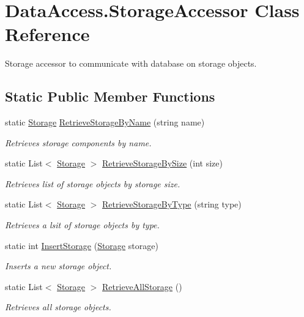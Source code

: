 \hypertarget{class_data_access_1_1_storage_accessor}{}\section{Data\+Access.\+Storage\+Accessor Class Reference}
\label{class_data_access_1_1_storage_accessor}


Storage accessor to communicate with database on storage objects.  


\subsection*{Static Public Member Functions}
\begin{DoxyCompactItemize}
\item 
static \hyperlink{class_business_objects_1_1_storage}{Storage} \hyperlink{class_data_access_1_1_storage_accessor_abb7e1e5d633910b7003fd0f7c2b99825}{Retrieve\+Storage\+By\+Name} (string name)
\begin{DoxyCompactList}\small\item\em Retrieves storage components by name. \end{DoxyCompactList}\item 
static List$<$ \hyperlink{class_business_objects_1_1_storage}{Storage} $>$ \hyperlink{class_data_access_1_1_storage_accessor_ae946acb35222d3b911c8f38938ef5c7d}{Retrieve\+Storage\+By\+Size} (int size)
\begin{DoxyCompactList}\small\item\em Retrieves list of storage objects by storage size. \end{DoxyCompactList}\item 
static List$<$ \hyperlink{class_business_objects_1_1_storage}{Storage} $>$ \hyperlink{class_data_access_1_1_storage_accessor_a9a989363273f5b9395817912303858db}{Retrieve\+Storage\+By\+Type} (string type)
\begin{DoxyCompactList}\small\item\em Retrieves a lsit of storage objects by type. \end{DoxyCompactList}\item 
static int \hyperlink{class_data_access_1_1_storage_accessor_a637e56c95349a4ec29fdf8046bf2e61c}{Insert\+Storage} (\hyperlink{class_business_objects_1_1_storage}{Storage} storage)
\begin{DoxyCompactList}\small\item\em Inserts a new storage object. \end{DoxyCompactList}\item 
static List$<$ \hyperlink{class_business_objects_1_1_storage}{Storage} $>$ \hyperlink{class_data_access_1_1_storage_accessor_ae14e363a18a78cebd20e2c0731e6236d}{Retrieve\+All\+Storage} ()
\begin{DoxyCompactList}\small\item\em Retrieves all storage objects. \end{DoxyCompactList}\end{DoxyCompactItemize}


